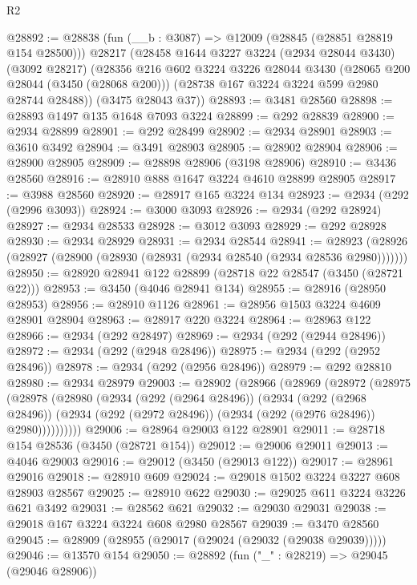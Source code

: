 \begin{lexlean}{R2}
\begin{coremodule}
@28892 := @28838
    (fun (__b : @3087) => @12009 (@28845 (@28851 @28819 @154 @28500)))
    @28217
    (@28458
      @1644
      @3227
      @3224
      (@2934 @28044 @3430)
      (@3092 @28217)
      (@28356
        @216
        @602
        @3224
        @3226
        @28044
        @3430
        (@28065 @200 @28044 (@3450 (@28068 @200)))
        (@28738 @167 @3224 @3224 @599 @2980 @28744 @28488))
      (@3475 @28043 @37))
@28893 := @3481 @28560
@28898 := @28893 @1497 @135 @1648 @7093 @3224
@28899 := @292 @28839
@28900 := @2934 @28899
@28901 := @292 @28499
@28902 := @2934 @28901
@28903 := @3610 @3492
@28904 := @3491 @28903
@28905 := @28902 @28904
@28906 := @28900 @28905
@28909 := @28898 @28906 (@3198 @28906)
@28910 := @3436 @28560
@28916 := @28910 @888 @1647 @3224 @4610 @28899 @28905
@28917 := @3988 @28560
@28920 := @28917 @165 @3224 @134
@28923 := @2934 (@292 (@2996 @3093))
@28924 := @3000 @3093
@28926 := @2934 (@292 @28924)
@28927 := @2934 @28533
@28928 := @3012 @3093
@28929 := @292 @28928
@28930 := @2934 @28929
@28931 := @2934 @28544
@28941 := @28923 (@28926 (@28927 (@28900 (@28930 (@28931 (@2934 @28540 (@2934 @28536 @2980)))))))
@28950 := @28920 @28941 @122 @28899 (@28718 @22 @28547 (@3450 (@28721 @22)))
@28953 := @3450 (@4046 @28941 @134)
@28955 := @28916 (@28950 @28953)
@28956 := @28910 @1126
@28961 := @28956 @1503 @3224 @4609 @28901 @28904
@28963 := @28917 @220 @3224
@28964 := @28963 @122
@28966 := @2934 (@292 @28497)
@28969 := @2934 (@292 (@2944 @28496))
@28972 := @2934 (@292 (@2948 @28496))
@28975 := @2934 (@292 (@2952 @28496))
@28978 := @2934 (@292 (@2956 @28496))
@28979 := @292 @28810
@28980 := @2934 @28979
@29003 := @28902
    (@28966
      (@28969
        (@28972
          (@28975
            (@28978
              (@28980
                (@2934
                  (@292 (@2964 @28496))
                  (@2934
                    (@292 (@2968 @28496))
                    (@2934 (@292 (@2972 @28496)) (@2934 (@292 (@2976 @28496)) @2980))))))))))
@29006 := @28964 @29003 @122 @28901
@29011 := @28718 @154 @28536 (@3450 (@28721 @154))
@29012 := @29006 @29011
@29013 := @4046 @29003
@29016 := @29012 (@3450 (@29013 @122))
@29017 := @28961 @29016
@29018 := @28910 @609
@29024 := @29018 @1502 @3224 @3227 @608 @28903 @28567
@29025 := @28910 @622
@29030 := @29025 @611 @3224 @3226 @621 @3492
@29031 := @28562 @621
@29032 := @29030 @29031
@29038 := @29018 @167 @3224 @3224 @608 @2980 @28567
@29039 := @3470 @28560
@29045 := @28909 (@28955 (@29017 (@29024 (@29032 (@29038 @29039)))))
@29046 := @13570 @154
@29050 := @28892 (fun ("_" : @28219) => @29045 (@29046 @28906))

\end{coremodule}
\end{lexlean}
